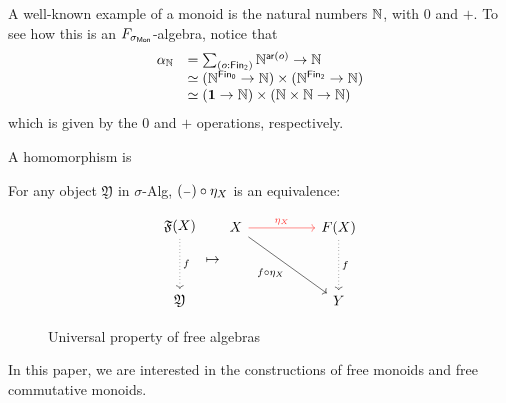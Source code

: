 \begin{example}
    A well-known example of a monoid is the natural numbers $\mathbb{N}$, with $0$ and $+$.
    To see how this is an $F_{\sigma_{\mathsf{Mon}}}$-algebra, notice that
    \[
        \begin{array}{rl}
            \alpha_{\Nat} &= \dsum{o:\Fin[2]}{\Nat^{\term{ar}(o)}} \to \Nat \\
                          &\eqv (\Nat^{\Fin[0]} \to \Nat) \times (\Nat^{\Fin[2]} \to \Nat) \\
                          &\eqv (\unitt \to \Nat) \times (\Nat \times \Nat \to \Nat)
        \end{array}
    \]
    which is given by the $0$ and $+$ operations, respectively.
\end{example}

\begin{definition}[Homomorphism]
    A homomorphism is
\end{definition}

For any object \( \mathfrak{Y} \) in $\sigma$-Alg, $({\scriptstyle{-}}) \circ \eta_X$ is an equivalence:

\begin{figure}[H]
    \centering
    \[\begin{tikzcd}[ampersand replacement=\&]
    	\mathfrak{F}(X) \\
    	\\
    	\mathfrak{Y}
    	\arrow["f", dotted, from=1-1, to=3-1]
    \end{tikzcd}
    \mapsto
    \begin{tikzcd}[ampersand replacement=\&]
    	X \&\& {F(X)} \\
    	\\
    	\&\& {Y}
    	\arrow["\eta_X", color={rgb,255:red,255;green,54;blue,51}, from=1-1, to=1-3]
    	\arrow["f \circ \eta_X"', from=1-1, to=3-3]
    	\arrow["{f}", dotted, from=1-3, to=3-3]
    \end{tikzcd}\]
    \caption{Universal property of free algebras}
    \label{fig:universal-property}
\end{figure}



In this paper, we are interested in the constructions of free monoids and free commutative monoids.